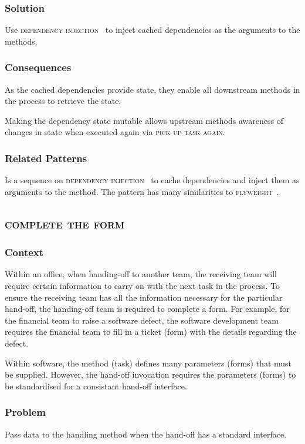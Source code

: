 \documentclass[prodmode]{style/acmlarge}
\begin{document}
\subsubsection*{\textbf{Solution}} Use \textsc{dependency injection}~\cite{ioc} to inject
cached dependencies as the arguments to the methods.

\subsubsection*{Consequences} As the cached dependencies provide state, they
enable all downstream methods in the process to retrieve the state.

Making the dependency state mutable allows upstream methods awareness of changes
in state when executed again via \textsc{pick up task again}.

\subsubsection*{Related Patterns} Is a sequence on \textsc{dependency
injection}~\cite{ioc} to cache dependencies and inject them as arguments to the
method.  The pattern has many similarities to \textsc{flyweight}~\cite{gof}.



\subsection{\textsc{\textbf{complete the form}}}

\subsubsection*{Context} Within an office, when handing-off to another team, the
receiving team will require certain information to carry on with the next task
in the process.  To ensure the receiving team has all the information necessary
for the particular hand-off, the handing-off team is required to complete a
form.  For example, for the financial team to raise a software defect, the
software development team requires the financial team to fill in a ticket (form)
with the details regarding the defect.

Within software, the method (task) defines many parameters (forms) that must be
supplied.  However, the hand-off invocation requires the parameters (forms) to
be standardised for a consistant hand-off interface.

\subsubsection*{\textbf{Problem}} Pass data to the handling method when the hand-off has
a standard interface.
\end{document}
